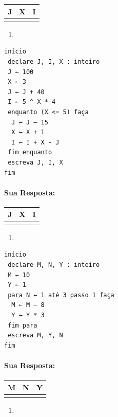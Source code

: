 \documentclass[12pt,a4paper]{article}
\providecommand{\tightlist}{%
      \setlength{\itemsep}{0pt}\setlength{\parskip}{0pt}}
\begin{document}
\begin{longtable}[]{@{}ccc@{}}
\toprule
J & X & I\tabularnewline
\midrule
\endhead
& &\tabularnewline
\bottomrule
\end{longtable}

    \begin{enumerate}
\def\labelenumi{\alph{enumi})}
\setcounter{enumi}{2}
\tightlist
\item
\end{enumerate}

\begin{verbatim}
início
 declare J, I, X : inteiro
 J ← 100
 X ← 3
 J ← J + 40
 I ← 5 ^ X * 4
 enquanto (X <= 5) faça
  J ← J – 15
  X ← X + 1
  I ← I + X - J
 fim enquanto
 escreva J, I, X
fim 
\end{verbatim}

    \hypertarget{sua-resposta}{%
\paragraph{Sua Resposta:}\label{sua-resposta}}

\begin{longtable}[]{@{}ccc@{}}
\toprule
J & X & I\tabularnewline
\midrule
\endhead
& &\tabularnewline
\bottomrule
\end{longtable}

    \begin{enumerate}
\def\labelenumi{\alph{enumi})}
\setcounter{enumi}{3}
\tightlist
\item
\end{enumerate}

\begin{verbatim}
início
 declare M, N, Y : inteiro
 M ← 10
 Y ← 1
 para N ← 1 até 3 passo 1 faça
  M ← M – 8
  Y ← Y * 3
 fim para
 escreva M, Y, N
fim 
\end{verbatim}

    \hypertarget{sua-resposta}{%
\paragraph{Sua Resposta:}\label{sua-resposta}}

\begin{longtable}[]{@{}ccc@{}}
\toprule
M & N & Y\tabularnewline
\midrule
\endhead
& &\tabularnewline
\bottomrule
\end{longtable}

    \begin{enumerate}
\def\labelenumi{\alph{enumi})}
\setcounter{enumi}{4}
\tightlist
\item
\end{enumerate}
\end{document}
